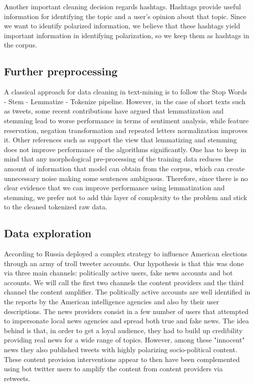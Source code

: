 \documentclass[12pt, authoryear]{elsarticle}
\begin{document}
Another important cleaning decision regards hashtags. Hashtags provide useful information for identifying the topic and a user's opinion about that topic. Since we want to identify polarized information, we believe that these hashtags yield important information in identifying polarization, so we keep them as hashtags in the corpus.

\subsection{Further preprocessing}

A classical approach for data cleaning in text-mining is to follow the Stop Words - Stem - Lemmatize - Tokenize pipeline. However, in the case of short texts such as tweets, some recent contributions \cite{preprocessing} have argued that lemmatization and stemming lead to worse performance in terms of sentiment analysis, while feature reservation, negation transformation and repeated letters normalization improves it. Other references such as \cite{Hollink2004} support the view that lemmatizing and stemming does not improve performance of the algorithms significantly. One has to keep in mind that any morphological pre-processing of the training data reduces the amount of information that model can obtain from the corpus, which can create unnecessary noise making some sentences ambiguous. Therefore, since there is no clear evidence that we can improve performance using lemmatization and stemming, we prefer not to add this layer of complexity to the problem and stick to the cleaned tokenized raw data. 

\subsection{Data exploration}
    
According to \cite{mueller2019report} Russia deployed a complex strategy to influence American elections through an army of troll tweeter accounts. Our hypothesis is that this was done via three main channels: politically active users, fake news accounts and bot accounts. We will call the first two channels the content providers and the third channel the content amplifier. The politically active accounts are well identified in the reports by the American intelligence agencies and also by their user descriptions. The news providers consist in a few number of users that attempted to impersonate local news agencies and spread both true and fake news. The idea behind is that, in order to get a loyal audience, they had to build up credibility providing real news for a wide range of topics. However, among these "innocent" news they also published tweets with highly polarizing socio-political content. These content provision interventions appear to then have been complemented using bot twitter users to amplify the content from content providers via retweets. 
\end{document}
